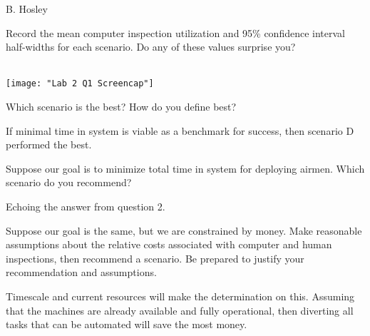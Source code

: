 \documentclass[answers]{exam}
\begin{document}
\hspace{\fill} {\large B. Hosley}
\bigskip

\begin{questions}

\question 
Record the mean computer inspection utilization and 95\% confidence interval half-widths for each scenario. Do any of these values surprise you?
\begin{solution} \\
	\texttt{[image: "Lab 2 Q1 Screencap"]}
	
\end{solution}


\question 
Which scenario is the best? How do you define best?
\begin{solution}
	If minimal time in system is viable as a benchmark for success, then scenario D performed the best.
\end{solution}

\question 
Suppose our goal is to minimize total time in system for deploying airmen. Which scenario do you recommend?
\begin{solution}
	Echoing the answer from question 2.
\end{solution}

\question 
Suppose our goal is the same, but we are constrained by money. Make reasonable assumptions about the relative costs associated with computer and human inspections, then recommend a scenario. Be prepared to justify your recommendation and assumptions.
\begin{solution}
	Timescale and current resources will make the determination on this.
	Assuming that the machines are already available and fully operational, 
	then diverting all tasks that can be automated will save the most money.
\end{solution}

\end{questions}
\end{document}
